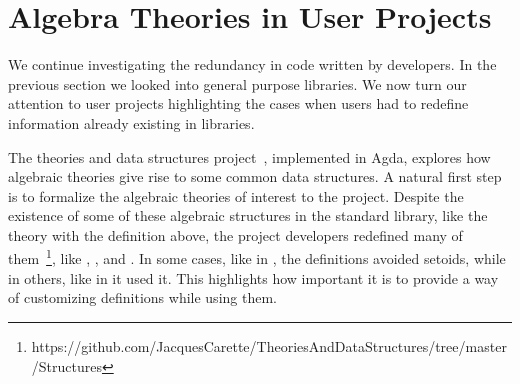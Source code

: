 \section{Algebra Theories in User Projects}
\label{sec:redun:user_projects}

We continue investigating the redundancy in code written by developers. In the previous section we looked into general purpose libraries. We now turn our attention to user projects highlighting the cases when users had to redefine information already existing in libraries. 

The theories and data structures project~\cite{theoriesAndDts}, implemented in Agda, explores how algebraic theories give rise to some common data structures. A natural first step is to formalize the algebraic theories of interest to the project. Despite the existence of some of these algebraic structures in the standard library, like the  theory with the definition above, the project developers redefined many of them~\footnote{https://github.com/JacquesCarette/TheoriesAndDataStructures/tree/master/Structures}, like , , and . In some cases, like in , the definitions avoided setoids, while in others, like in  it used it. This highlights how important it is to provide a way of customizing definitions while using them. 


